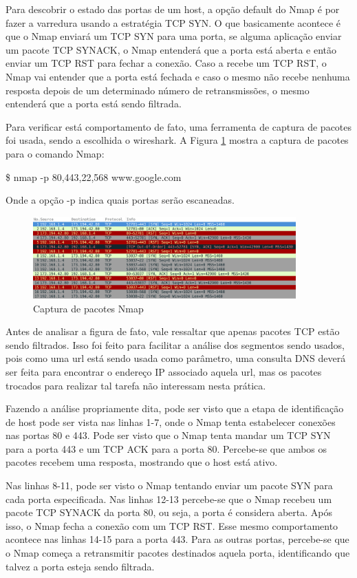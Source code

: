 Para descobrir o estado das portas de um host, a opção default do Nmap é por
fazer a varredura usando a estratégia TCP SYN. O que basicamente acontece é que
o Nmap enviará um TCP SYN para uma porta, se alguma aplicação enviar um
pacote TCP SYNACK, o Nmap entenderá que a porta está aberta e então enviar um
TCP RST para fechar a conexão. Caso a recebe um TCP RST, o Nmap vai entender que
a porta está fechada e caso o mesmo não recebe nenhuma resposta depois de um
determinado número de retransmissões, o mesmo entenderá que a porta está sendo
filtrada.

Para verificar está comportamento de fato, uma ferramenta de captura de pacotes
foi usada, sendo a escolhida o wireshark. A Figura \ref{fig:captura_nmap} mostra
a captura de pacotes para o comando Nmap:

\$ nmap -p 80,443,22,568 www.google.com

Onde a opção -p indica quais portas serão escaneadas.

\begin{figure}[h]
  \centering
  \includegraphics[width=0.9\textwidth]{figuras/captura_nmap.eps}
  \caption{Captura de pacotes Nmap}
  \label{fig:captura_nmap}
\end{figure}

Antes de analisar a figura de fato, vale ressaltar que apenas pacotes TCP estão
sendo filtrados. Isso foi feito para facilitar a análise dos segmentos sendo
usados, pois como uma url está sendo usada como parâmetro, uma consulta DNS
deverá ser feita para encontrar o endereço IP associado aquela url, mas os
pacotes trocados para realizar tal tarefa não interessam nesta prática.

Fazendo a análise propriamente dita, pode ser visto que a etapa de identificação de host pode ser vista nas linhas 1-7,
onde o Nmap tenta estabelecer conexões nas portas 80 e 443. Pode ser visto que o Nmap tenta mandar um TCP SYN para a porta
443 e um TCP ACK para a porta 80. Percebe-se que ambos os pacotes recebem uma resposta, mostrando que o host está ativo.

Nas linhas 8-11, pode ser visto o Nmap tentando enviar um pacote SYN para cada porta especificada. Nas linhas 12-13 percebe-se
que o Nmap recebeu um pacote TCP SYNACK da porta 80, ou seja, a porta é considera aberta. Após isso, o Nmap fecha a conexão com
um TCP RST. Esse mesmo comportamento acontece nas linhas 14-15 para a porta 443. Para as outras portas, percebe-se que o Nmap começa a
retransmitir pacotes destinados aquela porta, identificando que talvez a porta esteja sendo filtrada.

